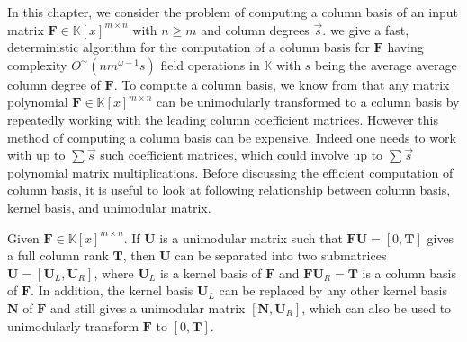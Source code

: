 In this chapter, we consider the problem of computing a column basis
of an input matrix $\mathbf{F}\in\mathbb{K}\left[x\right]^{m\times n}$
with $n\ge m$ and column degrees $\vec{s}$. we give a fast, deterministic
algorithm for the computation of a column basis for $\mathbf{F}$
having complexity $O^{\sim}\left(nm^{\omega-1}s\right)$ field operations
in $\mathbb{K}$ with $s$ being the average average column degree
of $\mathbf{F}$. To compute a column basis, we know from 
that any matrix polynomial $\mathbf{F}\in\mathbb{K}\left[x\right]^{m\times n}$
can be unimodularly transformed to a column basis by repeatedly working
with the leading column coefficient matrices. However this method
of computing a column basis can be expensive. Indeed one needs to
work with up to $\sum\vec{s}$ such coefficient matrices, which could
involve up to $\sum\vec{s}$ polynomial matrix multiplications.
Before discussing the efficient computation of column basis, it is
useful to look at following relationship between column basis, kernel
basis, and unimodular matrix.
\begin{lem}
\label{lem:unimodular_kernel_columnBasis}Given $\mathbf{F}\in\mathbb{K}\left[x\right]^{m\times n}$.
If $\mathbf{U}$ is a unimodular matrix such that $\mathbf{F}\mathbf{U}=\left[0,\mathbf{T}\right]$
gives a full column rank $\mathbf{T}$, then $\mathbf{U}$ can be
separated into two submatrices $\mathbf{U}=\left[\mathbf{U}_{L},\mathbf{U}_{R}\right]$,
where $\mathbf{U}_{L}$ is a kernel basis of $\mathbf{F}$ and $\mathbf{F}\mathbf{U}_{R}=\mathbf{T}$
is a column basis of $\mathbf{F}$. In addition, the kernel basis
$\mathbf{U}_{L}$ can be replaced by any other kernel basis $\mathbf{N}$
of $\mathbf{F}$ and still gives a unimodular matrix $\left[\mathbf{N},\mathbf{U}_{R}\right]$,
which can also be used to unimodularly transform $\mathbf{F}$ to
$\left[0,\mathbf{T}\right]$. \end{lem}
